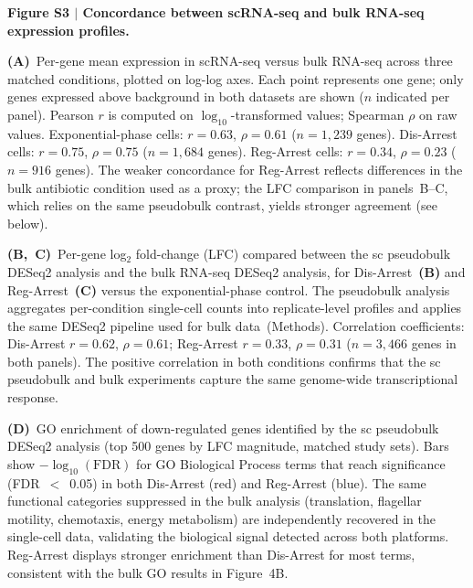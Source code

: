 
\textbf{Figure S3 $|$ Concordance between scRNA-seq and bulk RNA-seq expression
profiles.}

\textbf{(A)}~Per-gene mean expression in scRNA-seq versus bulk RNA-seq across three
matched conditions, plotted on log-log axes.
Each point represents one gene; only genes expressed above background in both
datasets are shown ($n$ indicated per panel).
Pearson $r$ is computed on $\log_{10}$-transformed values; Spearman $\rho$ on raw
values.
Exponential-phase cells: $r = 0.63$, $\rho = 0.61$ ($n = 1{,}239$ genes).
Dis-Arrest cells: $r = 0.75$, $\rho = 0.75$ ($n = 1{,}684$ genes).
Reg-Arrest cells: $r = 0.34$, $\rho = 0.23$ ($n = 916$ genes).
The weaker concordance for Reg-Arrest reflects differences in the bulk antibiotic
condition used as a proxy; the LFC comparison in panels~B--C, which relies on the
same pseudobulk contrast, yields stronger agreement (see below).

\textbf{(B,~C)}~Per-gene log$_2$ fold-change (LFC) compared between the sc pseudobulk
DESeq2 analysis and the bulk RNA-seq DESeq2 analysis, for Dis-Arrest~\textbf{(B)}
and Reg-Arrest~\textbf{(C)} versus the exponential-phase control.
The pseudobulk analysis aggregates per-condition single-cell counts into
replicate-level profiles and applies the same DESeq2 pipeline used for bulk
data~(Methods).
Correlation coefficients: Dis-Arrest $r = 0.62$, $\rho = 0.61$;
Reg-Arrest $r = 0.33$, $\rho = 0.31$ ($n = 3{,}466$ genes in both panels).
The positive correlation in both conditions confirms that the sc pseudobulk
and bulk experiments capture the same genome-wide transcriptional response.

\textbf{(D)}~GO enrichment of down-regulated genes identified by the sc pseudobulk
DESeq2 analysis (top 500 genes by LFC magnitude, matched study sets).
Bars show $-\log_{10}(\text{FDR})$ for GO Biological Process terms that reach
significance (FDR~$<$~0.05) in both Dis-Arrest (red) and Reg-Arrest (blue).
The same functional categories suppressed in the bulk analysis (translation,
flagellar motility, chemotaxis, energy metabolism) are independently recovered
in the single-cell data, validating the biological signal detected across both
platforms.
Reg-Arrest displays stronger enrichment than Dis-Arrest for most terms,
consistent with the bulk GO results in Figure~4B.
